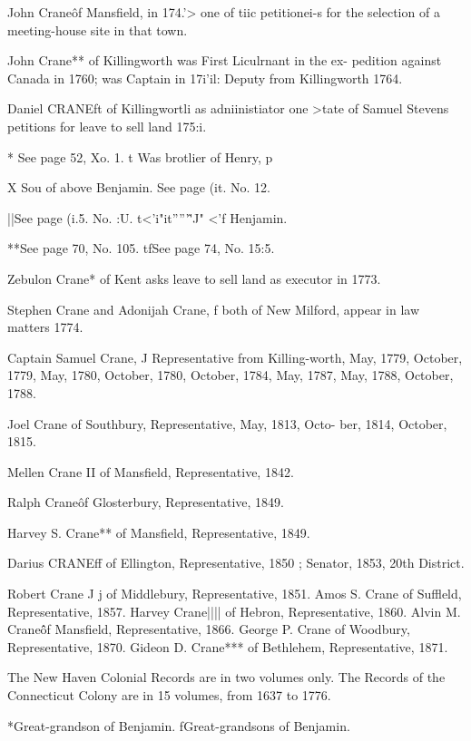 \documentclass{book}
\begin{document}
John Crane\^ of Mansfield, in 174.'> one of tiic petitionei-s for 
the selection of a meeting-house site in that town. 

John Crane** of Killingworth was First Liculrnant in the ex- 
pedition against Canada in 1760; was Captain in 17i'il: Deputy 
from Killingworth 1764. 

Daniel CRANEft of Killingwortli as adniinistiator one >tate of 
Samuel Stevens petitions for leave to sell land 175:i. 



* See page 52, Xo. 1. t Was brotlier of Henry, p 

X Sou of above Benjamin.  See page (it. No. 12. 

||See page (i.5. No. :U. t<'i"it'''''\^'J" <'f Henjamin. 

**See page 70, No. 105. tfSee page 74, No. 15:5. 




Zebulon Crane* of Kent asks leave to sell land as executor in 
1773. 

Stephen Crane and Adonijah Crane, f both of New Milford, 
appear in law matters 1774. 

Captain Samuel Crane, J Representative from Killing-worth, 
May, 1779, October, 1779, May, 1780, October, 1780, October, 
1784, May, 1787, May, 1788, October, 1788. 

Joel Crane of Southbury, Representative, May, 1813, Octo- 
ber, 1814, October, 1815. 

Mellen Crane II of Mansfield, Representative, 1842. 

Ralph Crane\^ of Glosterbury, Representative, 1849. 

Harvey S. Crane** of Mansfield, Representative, 1849. 

Darius CRANEff of Ellington, Representative, 1850 ; Senator, 
1853, 20th District. 

Robert Crane J j of Middlebury, Representative, 1851. 
Amos S. Crane of Suffleld, Representative, 1857. 
Harvey Crane|||| of Hebron, Representative, 1860. 
Alvin M. Crane\^\^ of Mansfield, Representative, 1866. 
George P. Crane of Woodbury, Representative, 1870. 
Gideon D. Crane*** of Bethlehem, Representative, 1871. 

The New Haven Colonial Records are in two volumes only. The 
Records of the Connecticut Colony are in 15 volumes, from 1637 to 1776. 



*Great-grandson of Benjamin. fGreat-grandsons of Benjamin. 
\end{document}
